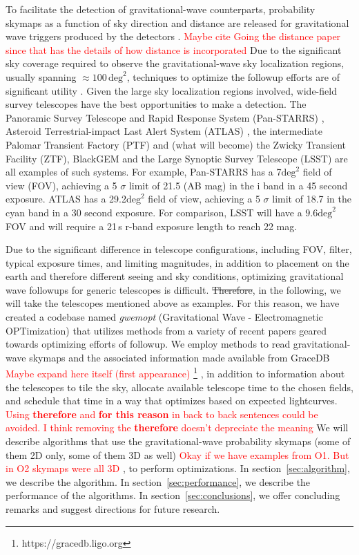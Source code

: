 \documentclass[twocolumn]{aastex62}
\begin{document}
To facilitate the detection of gravitational-wave counterparts, probability skymaps as a function of sky direction and distance are released for gravitational wave triggers produced by the detectors \citep{SiPr2014,BeMa2015}.\textcolor{red}{ Maybe cite Going the distance paper since that has the details of how distance is incorporated} 
Due to the significant sky coverage required to observe the gravitational-wave sky localization regions, usually spanning $\approx 100\,\textrm{deg}^2$, techniques to optimize the followup efforts are of significant utility \citep{Fair2009,Fair2011,Grover:2013,WeCh2010,SiAy2014,SiPr2014,BeMa2015,EsVi2015,CoLi2015,KlVe2016}.
Given the large sky localization regions involved, wide-field survey telescopes have the best opportunities to make a detection. 
The Panoramic Survey Telescope and Rapid Response System (Pan-STARRS) \citep{MoKa2012}, Asteroid Terrestrial-impact Last Alert System (ATLAS) \citep{Ton2011}, the intermediate Palomar Transient Factory (PTF) \citep{RaSh2009} and (what will become) the Zwicky Transient Facility (ZTF), BlackGEM \citep{BlGr2015} and the Large Synoptic Survey Telescope (LSST) \citep{Ivezic2014} are all examples of such systems.
For example, Pan-STARRS has a 7$\textrm{deg}^2$ field of view (FOV), achieving a 5 $\sigma$ limit of 21.5 (AB mag) in the i band in a 45 second exposure. ATLAS has a 29.2$\textrm{deg}^2$ field of view, achieving a 5 $\sigma$ limit of 18.7 in the cyan band in a 30 second exposure. For comparison, LSST will have a $9.6\textrm{deg}^2$ FOV and will require a 21\,s r-band exposure length to reach 22 mag.

Due to the significant difference in telescope configurations, including FOV, filter, typical exposure times, and limiting magnitudes, in addition to placement on the earth and therefore different seeing and sky conditions, optimizing gravitational wave followups for generic telescopes is difficult. \sout{Therefore}, in the following, we will take the telescopes mentioned above as examples.
For this reason, we have created a codebase named \emph{gwemopt} (Gravitational Wave - Electromagnetic OPTimization) that utilizes methods from a variety of recent papers geared towards optimizing efforts of followup. We employ methods to read gravitational-wave skymaps and the associated information made available from GraceDB \textcolor{red}{Maybe expand here itself (first appearance)}
\footnote{https://gracedb.ligo.org} \citep{AbEA2016b}, in addition to information about the telescopes to tile the sky, allocate available telescope time to the chosen fields, and schedule that time in a way that optimizes based on expected lightcurves.
\textcolor{red}{ Using \textbf{therefore} and \textbf{for this reason} in back to back sentences could be avoided. I think removing the \textbf{therefore} doesn't depreciate the meaning}
We will describe algorithms that use the gravitational-wave probability skymaps (some of them 2D only, some of them 3D as well)\textcolor{red}{ Okay if we have examples from O1. But in O2 skymaps were all 3D }, to perform optimizations.
In section~\ref{sec:algorithm}, we describe the algorithm.
In section~\ref{sec:performance}, we describe the performance of the algorithms.
In section~\ref{sec:conclusions}, we offer concluding remarks and suggest directions for future research.
\end{document}
